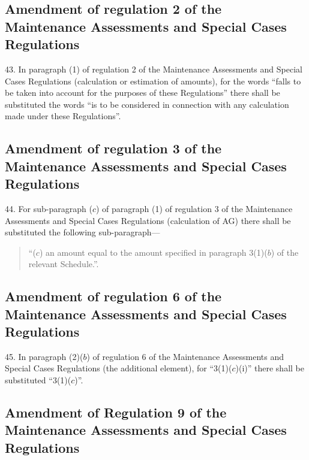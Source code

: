 \documentclass[12pt,a4paper]{article}
\begin{document}
\subsection[43. Amendment of regulation 2 of the Maintenance Assessments and Special Cases Regulations]{\sloppy Amendment of regulation 2 of the Maintenance Assessments and Special Cases Regulations}

43.  In paragraph (1) of regulation 2 of the Maintenance Assessments and Special Cases Regulations (calculation or estimation of amounts), for the words “falls to be taken into account for the purposes of these Regulations” there shall be substituted the words “is to be considered in connection with any calculation made under these Regulations”.

\subsection[44. Amendment of regulation 3 of the Maintenance Assessments and Special Cases Regulations]{\sloppy Amendment of regulation 3 of the Maintenance Assessments and Special Cases Regulations}

44.  For sub-paragraph ($c$) of paragraph (1) of regulation 3 of the Maintenance Assessments and Special Cases Regulations (calculation of AG) there shall be substituted the following sub-paragraph—
\begin{quotation}
“($c$) an amount equal to the amount specified in paragraph 3(1)($b$) of the relevant Schedule.”.
\end{quotation}

\subsection[45. Amendment of regulation 6 of the Maintenance Assessments and Special Cases Regulations]{\sloppy Amendment of regulation 6 of the Maintenance Assessments and Special Cases Regulations}

45.  In paragraph (2)($b$) of regulation 6 of the Maintenance Assessments and Special Cases Regulations (the additional element), for “3(1)($c$)(i)” there shall be substituted “3(1)($c$)”.

\subsection[46. Amendment of Regulation 9 of the Maintenance Assessments and Special Cases Regulations]{Amendment of Regulation 9 of the Maintenance Assessments and Special Cases Regulations}
\end{document}
